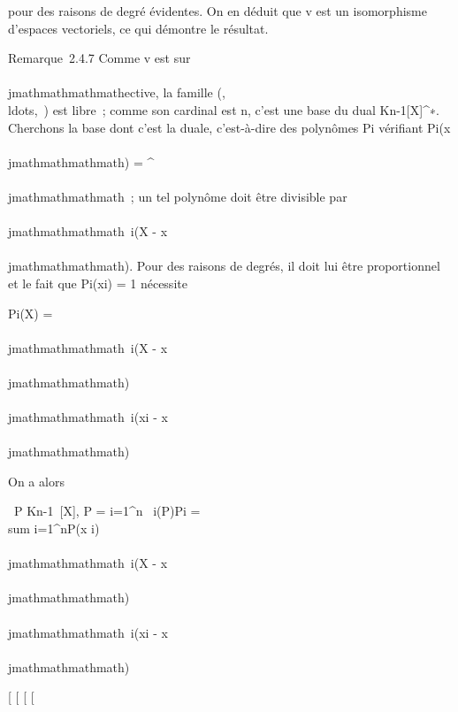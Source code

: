 pour des raisons de degré évidentes. On en déduit que v est un
isomorphisme d'espaces vectoriels, ce qui démontre le résultat.

Remarque~2.4.7 Comme v est sur\\\\jmathmathmathmathective, la famille
(,\\ldots,\phin~)
est libre~; comme son cardinal est n, c'est une base du dual
Kn-1{[}X{]}^∗. Cherchons la base dont c'est la
duale, c'est-à-dire des polynômes Pi vérifiant
Pi(x\\\\jmathmathmathmath) = \deltai^\\\\jmathmathmathmath~; un tel polynôme
doit être divisible par
\∏ ~
\\\\jmathmathmathmath\neq~i(X - x\\\\jmathmathmathmath). Pour des
raisons de degrés, il doit lui être proportionnel et le fait que
Pi(xi) = 1 nécessite

Pi(X) = \∏
\\\\jmathmathmathmath\neq~i(X - x\\\\jmathmathmathmath)
\over \∏
\\\\jmathmathmathmath\neq~i(xi - x\\\\jmathmathmathmath)

On a alors

\forall~P \in Kn-1~{[}X{]}, P =
\sum i=1^n\phi~
i(P)Pi = \\sum
i=1^nP(x i) \∏
\\\\jmathmathmathmath\neq~i(X - x\\\\jmathmathmathmath)
\over \∏
\\\\jmathmathmathmath\neq~i(xi - x\\\\jmathmathmathmath)

{[}
{[}
{[}
{[}
